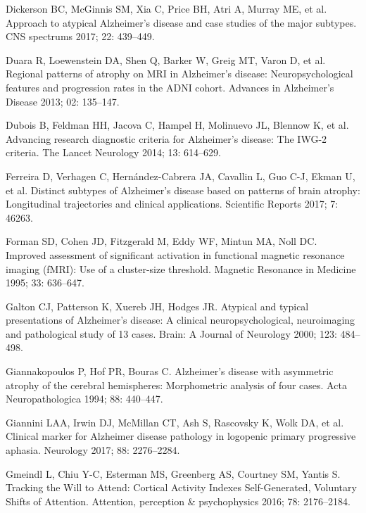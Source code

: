 \documentclass[]{article}
\begin{document}
\hypertarget{ref-dickerson_approach_2017}{}
Dickerson BC, McGinnis SM, Xia C, Price BH, Atri A, Murray ME, et al.
Approach to atypical Alzheimer's disease and case studies of the major
subtypes. CNS spectrums 2017; 22: 439--449.

\hypertarget{ref-duara_regional_2013}{}
Duara R, Loewenstein DA, Shen Q, Barker W, Greig MT, Varon D, et al.
Regional patterns of atrophy on MRI in Alzheimer's disease:
Neuropsychological features and progression rates in the ADNI cohort.
Advances in Alzheimer's Disease 2013; 02: 135--147.

\hypertarget{ref-dubois_advancing_2014}{}
Dubois B, Feldman HH, Jacova C, Hampel H, Molinuevo JL, Blennow K, et
al. Advancing research diagnostic criteria for Alzheimer's disease: The
IWG-2 criteria. The Lancet Neurology 2014; 13: 614--629.

\hypertarget{ref-ferreira_distinct_2017}{}
Ferreira D, Verhagen C, Hernández-Cabrera JA, Cavallin L, Guo C-J, Ekman
U, et al. Distinct subtypes of Alzheimer's disease based on patterns of
brain atrophy: Longitudinal trajectories and clinical applications.
Scientific Reports 2017; 7: 46263.

\hypertarget{ref-forman_improved_1995}{}
Forman SD, Cohen JD, Fitzgerald M, Eddy WF, Mintun MA, Noll DC. Improved
assessment of significant activation in functional magnetic resonance
imaging (fMRI): Use of a cluster-size threshold. Magnetic Resonance in
Medicine 1995; 33: 636--647.

\hypertarget{ref-galton_atypical_2000}{}
Galton CJ, Patterson K, Xuereb JH, Hodges JR. Atypical and typical
presentations of Alzheimer's disease: A clinical neuropsychological,
neuroimaging and pathological study of 13 cases. Brain: A Journal of
Neurology 2000; 123: 484--498.

\hypertarget{ref-giannakopoulos_alzheimers_1994}{}
Giannakopoulos P, Hof PR, Bouras C. Alzheimer's disease with asymmetric
atrophy of the cerebral hemispheres: Morphometric analysis of four
cases. Acta Neuropathologica 1994; 88: 440--447.

\hypertarget{ref-giannini_clinical_2017}{}
Giannini LAA, Irwin DJ, McMillan CT, Ash S, Rascovsky K, Wolk DA, et al.
Clinical marker for Alzheimer disease pathology in logopenic primary
progressive aphasia. Neurology 2017; 88: 2276--2284.

\hypertarget{ref-gmeindl_tracking_2016}{}
Gmeindl L, Chiu Y-C, Esterman MS, Greenberg AS, Courtney SM, Yantis S.
Tracking the Will to Attend: Cortical Activity Indexes Self-Generated,
Voluntary Shifts of Attention. Attention, perception \& psychophysics
2016; 78: 2176--2184.
\end{document}
